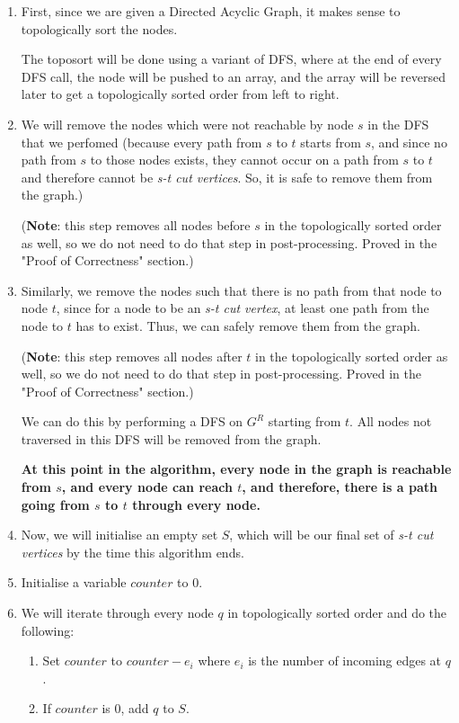 \documentclass{article}
\begin{document}
\begin{enumerate}
    \item First, since we are given a Directed Acyclic Graph, it makes sense to topologically sort the nodes. 

    The toposort will be done using a variant of DFS, where at the end of every DFS call, the node will be pushed to an array, and the array will be reversed later to get a topologically sorted order from left to right. 

    \item We will remove the nodes which were not reachable by node $s$ in the DFS that we perfomed (because every path from $s$ to $t$ starts from $s$, and since no path from $s$ to those nodes exists, they cannot occur on a path from $s$ to $t$ and therefore cannot be \emph{s-t cut vertices}. So, it is safe to remove them from the graph.) 

    (\textbf{Note}: this step removes all nodes before $s$ in the topologically sorted order as well, so we do not need to do that step in post-processing. Proved in the "Proof of Correctness" section.)

    \item Similarly, we remove the nodes such that there is no path from that node to node $t$, since for a node to be an \emph{s-t cut vertex}, at least one path from the node to $t$ has to exist. Thus, we can safely remove them from the graph. 

    (\textbf{Note}: this step removes all nodes after $t$ in the topologically sorted order as well, so we do not need to do that step in post-processing. Proved in the "Proof of Correctness" section.)

    We can do this by performing a DFS on $G^R$ starting from $t$. All nodes not traversed in this DFS will be removed from the graph.

    \textbf{At this point in the algorithm, every node in the graph is reachable from $s$, and every node can reach $t$, and therefore, there is a path going from $s$ to $t$ through every node.}

    \item Now, we will initialise an empty set $S$, which will be our final set of \emph{s-t cut vertices} by the time this algorithm ends. 

    \item Initialise a variable $counter$ to 0. 

    \newpage

    \item We will iterate through every node $q$ in topologically sorted order and do the following:
        \begin{enumerate}
            \item Set $counter$ to $counter - e_i$ where $e_i$ is the number of incoming edges at $q$. 
            \item If $counter$ is 0, add $q$ to $S$.


\end{enumerate}
\end{enumerate}
\end{document}
